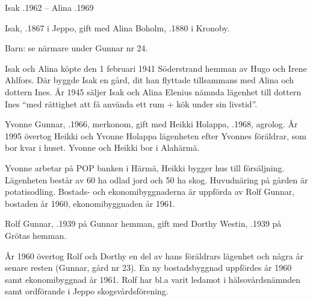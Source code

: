 Isak .1962  --  Alina .1969


Isak, .1867 i Jeppo, gift med Alina Boholm, .1880 i Kronoby.

Barn: se närmare under Gunnar nr 24.

Isak och Alina köpte den 1 februari 1941 Söderstrand hemman av Hugo och Irene Ahlfors. Där byggde Isak en gård, dit han flyttade tillsammans med Alina och dottern Ines. År 1945 säljer Isak och Alina Elenius nämnda lägenhet till dottern Ines 	``med rättighet att få använda ett rum + kök under sin livstid''.




Yvonne Gunnar, .1966, merkonom, gift med Heikki Holappa, .1968, agrolog. År 1995 övertog Heikki och Yvonne Holappa lägenheten efter Yvonnes föräldrar, som bor kvar i huset. Yvonne och Heikki bor i Alahärmä.
\begin{jhchildren}
  \item {}
  \item {}
  \item {}
  \item {}
  \item {}
\end{jhchildren}
Yvonne arbetar på POP banken i Härmä, Heikki bygger hus till försäljning. Lägenheten består av 60 ha odlad jord och 50 ha skog. Huvudnäring på gården är potatisodling. Bostads- och ekonomibyggnaderna är uppförda av Rolf Gunnar, bostaden år 1960, ekonomibyggnaden år 1961.


Rolf Gunnar, .1939 på Gunnar hemman, gift med Dorthy Westin, .1939 på Grötas hemman.
\begin{jhchildren}
  \item {}
  \item {}
\end{jhchildren}
År 1960 övertog Rolf och Dorthy en del av hans föräldrars lägenhet och några år senare resten (Gunnar, gård nr 23). En ny bostadsbyggnad uppfördes år 1960 samt ekonomibyggnad år 1961. Rolf har bl.a varit ledamot i hälsovårdsnämnden samt ordförande i Jeppo skogsvårdsförening.




